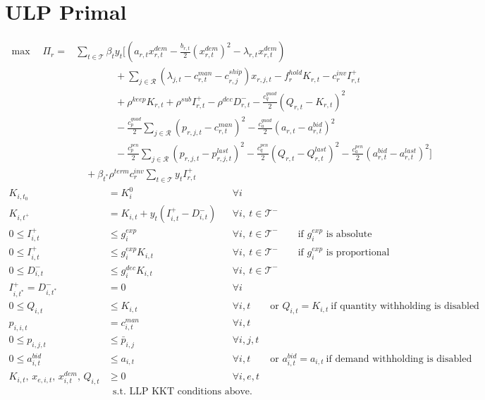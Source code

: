 \documentclass[11pt]{article}
\begin{document}
\section*{ULP Primal}
\begin{align}
\max \quad \Pi_r
= {} &
\sum_{t\in\mathcal{T}} \beta_t y_t
\Bigg[
\left(
a_{r,t}x^{dem}_{r,t}
- \frac{b_{r,t}}{2}(x^{dem}_{r,t})^2
- \lambda_{r,t}x^{dem}_{r,t}
\right)
\nonumber\\
&\qquad\qquad
+ \sum_{j\in\mathcal{R}}
\left(
\lambda_{j,t}
- c^{man}_{r,t}
- c^{ship}_{r,j}
\right)x_{r,j,t}
- f^{hold}_{r}K_{r,t}
- c^{inv}_{r}I^+_{r,t}
\nonumber\\
&\qquad\qquad
+ \rho^{keep}K_{r,t}
+ \rho^{sub}I^+_{r,t}
- \rho^{dec}D^-_{r,t}
- \frac{c_q^{quad}}{2}\left(Q_{r,t}-K_{r,t}\right)^2
\nonumber\\
&\qquad\qquad
- \frac{c_p^{quad}}{2}\sum_{j\in\mathcal{R}}
\left(p_{r,j,t}-c^{man}_{r,t}\right)^2
- \frac{c_a^{quad}}{2}\left(a_{r,t}-a^{bid}_{r,t}\right)^2
\nonumber\\
&\qquad\qquad
- \frac{c_p^{pen}}{2}\sum_{j\in\mathcal{R}}
\left(p_{r,j,t}-p^{last}_{r,j,t}\right)^2
- \frac{c_q^{pen}}{2}\left(Q_{r,t}-Q^{last}_{r,t}\right)^2
- \frac{c_a^{pen}}{2}\left(a^{bid}_{r,t}-a^{last}_{r,t}\right)^2
\Bigg]
\nonumber\\
&\quad
+ \beta_{t^*}\rho^{term}c^{inv}_{r}\sum_{t\in\mathcal{T}} y_t I^+_{r,t}
\end{align}
\begin{align}
K_{i,t_0} &= K_i^0
&& \forall i
\\
K_{i,t^+} &= K_{i,t} + y_t\left(I^+_{i,t}-D^-_{i,t}\right)
&& \forall i,\ t\in\mathcal{T}^{-}
\\
0 \le I^+_{i,t} &\le g_i^{exp}
&& \forall i,\ t\in\mathcal{T}^{-}
\qquad \text{if } g_i^{exp}\text{ is absolute}
\\
0 \le I^+_{i,t} &\le g_i^{exp}K_{i,t}
&& \forall i,\ t\in\mathcal{T}^{-}
\qquad \text{if } g_i^{exp}\text{ is proportional}
\\
0 \le D^-_{i,t} &\le g_i^{dec}K_{i,t}
&& \forall i,\ t\in\mathcal{T}^{-}
\\
I^+_{i,t^*} = D^-_{i,t^*} &= 0
&& \forall i
\\
0 \le Q_{i,t} &\le K_{i,t}
&& \forall i,t
\qquad \text{or } Q_{i,t}=K_{i,t}\ \text{if quantity withholding is disabled}
\\
p_{i,i,t} &= c^{man}_{i,t}
&& \forall i,t
\\
0 \le p_{i,j,t} &\le \bar p_{i,j}
&& \forall i,j,t
\\
0 \le a^{bid}_{i,t} &\le a_{i,t}
&& \forall i,t
\qquad \text{or } a^{bid}_{i,t}=a_{i,t}\ \text{if demand withholding is disabled}
\\
K_{i,t},\,x_{e,i,t},\,x^{dem}_{i,t},\,Q_{i,t} &\ge 0
&& \forall i,e,t
\end{align}
\[
\text{s.t. LLP KKT conditions above.}
\]
\end{document}
